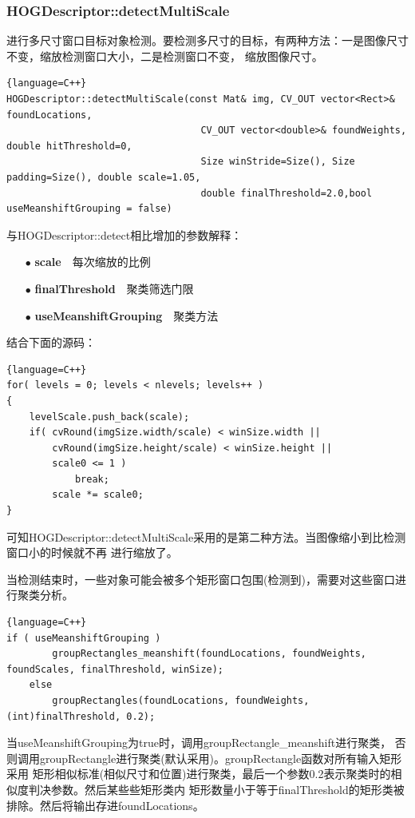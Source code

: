 \documentclass[10pt,technote,onecolumn,twoside]{IEEEtran}
\begin{document}
\subsubsection{HOGDescriptor::detectMultiScale}
进行多尺寸窗口目标对象检测。要检测多尺寸的目标，有两种方法：一是图像尺寸不变，缩放检测窗口大小，二是检测窗口不变，
缩放图像尺寸。
\begin{lstlisting}{language=C++}
HOGDescriptor::detectMultiScale(const Mat& img, CV_OUT vector<Rect>& foundLocations,
                                  CV_OUT vector<double>& foundWeights, double hitThreshold=0,
                                  Size winStride=Size(), Size padding=Size(), double scale=1.05,
                                  double finalThreshold=2.0,bool useMeanshiftGrouping = false)
\end{lstlisting}
与\textsf{HOGDescriptor::detect}相比增加的参数解释：
\begin{enumerate}
\item[$\bullet$]\textbf{scale}~~每次缩放的比例
\item[$\bullet$]\textbf{finalThreshold}~~聚类筛选门限
\item[$\bullet$]\textbf{useMeanshiftGrouping}~~聚类方法
\end{enumerate}
结合下面的源码：
\begin{lstlisting}{language=C++}
for( levels = 0; levels < nlevels; levels++ )
{
	levelScale.push_back(scale);
    if( cvRound(imgSize.width/scale) < winSize.width ||
        cvRound(imgSize.height/scale) < winSize.height ||
        scale0 <= 1 )
            break;
        scale *= scale0;
}
\end{lstlisting}
可知\textsf{HOGDescriptor::detectMultiScale}采用的是第二种方法。当图像缩小到比检测窗口小的时候就不再
进行缩放了。

当检测结束时，一些对象可能会被多个矩形窗口包围(检测到)，需要对这些窗口进行聚类分析。
\begin{lstlisting}{language=C++}
if ( useMeanshiftGrouping )
        groupRectangles_meanshift(foundLocations, foundWeights, foundScales, finalThreshold, winSize);
    else
        groupRectangles(foundLocations, foundWeights, (int)finalThreshold, 0.2);
\end{lstlisting}
当\textsf{useMeanshiftGrouping}为\textsf{true}时，调用\textsf{groupRectangle\_meanshift}进行聚类，
否则调用\textsf{groupRectangle}进行聚类(默认采用)。\textsf{groupRectangle}函数对所有输入矩形采用
矩形相似标准(相似尺寸和位置)进行聚类，最后一个参数0.2表示聚类时的相似度判决参数。然后某些些矩形类内
矩形数量小于等于\textsf{finalThreshold}的矩形类被排除。然后将输出存进\textsf{foundLocations}。
\end{document}
